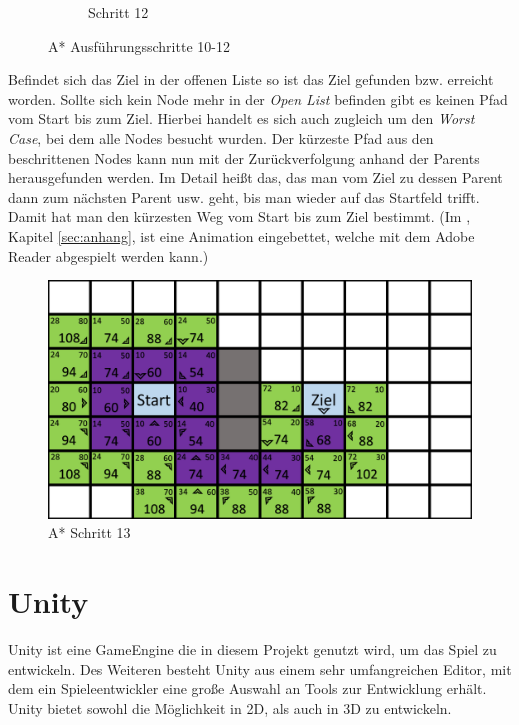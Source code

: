 \begin{figure}[H]
\begin{subfigure}[b]{0.3\textwidth}
        \caption{Schritt 12}
        \label{fig:aStartStep12}
    \end{subfigure}
    \caption{A* Ausführungsschritte 10-12}\label{fig:aStarStep10_12}
\end{figure}

Befindet sich das Ziel in der offenen Liste so ist das Ziel gefunden bzw. erreicht worden. Sollte sich kein Node mehr in der \textit{Open List} befinden gibt es keinen Pfad vom Start bis zum Ziel. Hierbei handelt es sich auch zugleich um den \textit{Worst Case}, bei dem alle Nodes besucht wurden.
Der kürzeste Pfad aus den beschrittenen Nodes kann nun mit der Zurückverfolgung anhand der Parents herausgefunden werden. Im Detail hei\ss t das, das man vom Ziel zu dessen Parent dann zum nächsten Parent usw. geht, bis man wieder auf das Startfeld trifft. Damit hat man den kürzesten Weg vom Start bis zum Ziel bestimmt. (Im , Kapitel \ref{sec:anhang}, ist eine Animation eingebettet, welche mit dem Adobe Reader abgespielt werden kann.)  
\begin{figure}[H]
    \centering
    \includegraphics[width=\textwidth]{assets/aStarStep13.png}
    \caption{A* Schritt 13}\label{fig:aStarStep13}
\end{figure}

\label{sec:fundamentals}
\section{Unity}
Unity ist eine GameEngine die in diesem Projekt genutzt wird, um das Spiel zu entwickeln. Des Weiteren besteht Unity aus einem sehr umfangreichen Editor, mit dem ein Spieleentwickler eine große Auswahl an Tools zur Entwicklung erh\"alt. Unity bietet sowohl die M\"oglichkeit in 2D, als auch in 3D zu entwickeln.

